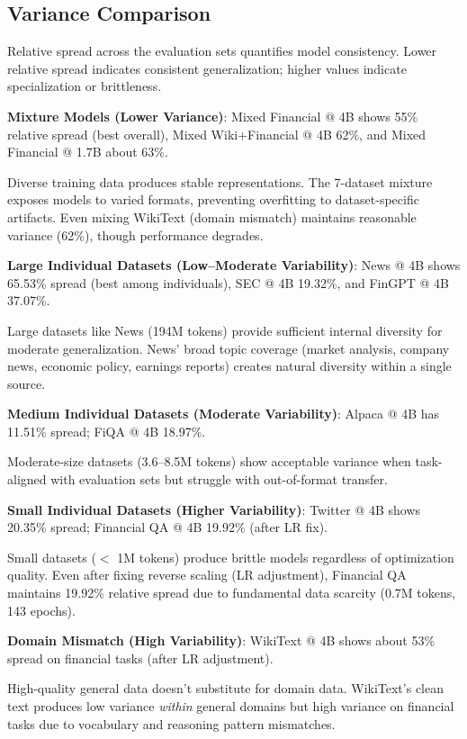 \subsection{Variance Comparison}

Relative spread across the evaluation sets quantifies model consistency. Lower relative spread indicates consistent generalization; higher values indicate specialization or brittleness.

\textbf{Mixture Models (Lower Variance)}: Mixed Financial @ 4B shows 55\% relative spread (best overall), Mixed Wiki+Financial @ 4B 62\%, and Mixed Financial @ 1.7B about 63\%.

Diverse training data produces stable representations. The 7-dataset mixture exposes models to varied formats, preventing overfitting to dataset-specific artifacts. Even mixing WikiText (domain mismatch) maintains reasonable variance (62\%), though performance degrades.

\textbf{Large Individual Datasets (Low–Moderate Variability)}: News @ 4B shows 65.53\% spread (best among individuals), SEC @ 4B 19.32\%, and FinGPT @ 4B 37.07\%.

Large datasets like News (194M tokens) provide sufficient internal diversity for moderate generalization. News' broad topic coverage (market analysis, company news, economic policy, earnings reports) creates natural diversity within a single source.

\textbf{Medium Individual Datasets (Moderate Variability)}: Alpaca @ 4B has 11.51\% spread; FiQA @ 4B 18.97\%.

Moderate-size datasets (3.6–8.5M tokens) show acceptable variance when task-aligned with evaluation sets but struggle with out-of-format transfer.

\textbf{Small Individual Datasets (Higher Variability)}: Twitter @ 4B shows 20.35\% spread; Financial QA @ 4B 19.92\% (after LR fix).

Small datasets ($<$ 1M tokens) produce brittle models regardless of optimization quality. Even after fixing reverse scaling (LR adjustment), Financial QA maintains 19.92\% relative spread due to fundamental data scarcity (0.7M tokens, 143 epochs).

\textbf{Domain Mismatch (High Variability)}: WikiText @ 4B shows about 53\% spread on financial tasks (after LR adjustment).

High-quality general data doesn't substitute for domain data. WikiText's clean text produces low variance \textit{within} general domains but high variance on financial tasks due to vocabulary and reasoning pattern mismatches.

